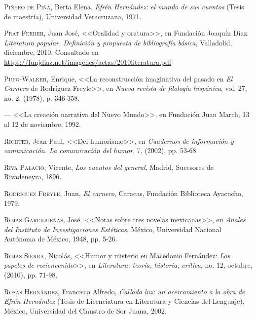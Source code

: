 \documentclass[14pt,twoside,final]{extbook} %
\begin{document}
\textsc{Piñero de Piña}, Berta Elena, \emph{Efrén Hernández: el mundo de sus cuentos} (Tesis de maestría), Universidad Veracruzana, 1971.\label{bib:piñero1971}

\textsc{Prat Ferrer}, Juan José, <<Oralidad y oratura>>, en Fundación Joaquín Díaz. \emph{Literatura popular. Definición y propuesta de bibliografía básica}, Valladolid, diciembre, 2010. Consultado en \guilsinglleft\url{https://funjdiaz.net/imagenes/actas/2010literatura.pdf}\guilsinglright

\textsc{Pupo-Walker}, Enrique, <<La reconstrucción imaginativa del pasado en \emph{El Carnero} de Rodríguez Freyle>>, en \emph{Nueva revista de filología hispánica}, vol. 27, no. 2, (1978), p. 346-358.\label{bib:pupowalker1978}

--- <<La creación narrativa del Nuevo Mundo>>, en Fundación Juan March, 13 al 12 de noviembre, 1992.\label{bib:pupowalker1992}

\textsc{Richter}, Jean Paul, <<Del humorismo>>, en \emph{Cuadernos de información y comunicación. La comunicación del humor}, 7, (2002), pp. 53-68.\label{bib:richter2002}

\textsc{Riva Palacio}, Vicente, \emph{Los cuentos del general}, Madrid, Sucesores de Rivadeneyra, 1896.\label{bib:rivapalacio1896}

\textsc{Rodríguez Freyle}, Juan, \emph{El carnero}, Caracas, Fundación Biblioteca Ayacucho, 1979.\label{bib:rodriguez1979}

\textsc{Rojas Garcidueñas}, José, <<Notas sobre tres novelas mexicanas>>, en \emph{Ana\-les del Instituto de Investigaciones Estéticas}, México, Universidad Nacional Autónoma de México, 1948, pp. 5-26.\label{bib:rojas1948}

\textsc{Rojas Sierra}, Nicolás, <<Humor y misterio en Macedonio Fernández: \emph{Los papeles de recienvenido}>>, en \emph{Literatura: teoría, historia, crítica}, no. 12, octubre, (2010), pp. 71-98.\label{bib:rojas2010}

\textsc{Rosas Hernández}, Francisco Alfredo, \emph{Callada luz: un acercamiento a la obra de Efrén Hernández} (Tesis de Licenciatura en Literatura y Ciencias del Lenguaje), México, Universidad del Claustro de Sor Juana, 2002.\label{bib:rosas2002a}
\end{document}
